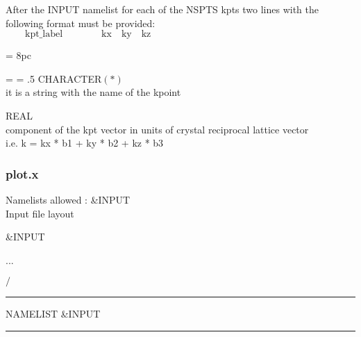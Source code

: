 \noindent After the INPUT namelist for each of the NSPTS kpts two lines with the following
format must be provided:\\

\noindent $\qquad \textrm{kpt\_label} \qquad\qquad   \textrm{kx} \quad  \textrm{ky} \quad \textrm{kz}$

\newdimen\descindent \descindent = 8pc
{\noindent \leftskip = \descindent \parskip = .5\baselineskip
{}%
CHARACTER$(*)$ \\ it is a string with the name of the kpoint \par

\noindent{}%
REAL \\ component of the kpt vector in units of crystal reciprocal
                 lattice vector \\ i.e. k = kx * b1 + ky * b2 + kz * b3 \par
}

\subsubsection{plot.x}
\noindent Namelists allowed : \&INPUT\\
\noindent Input file layout
\begin{description}
  \item \&INPUT
  \item ...
  \item $/$
\end{description}

\begin{centering}
\rule{2.2in}{0.01in} NAMELIST \&INPUT \rule{2.2in}{0.01in}
\end{centering}\\

